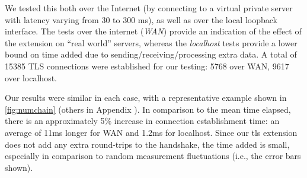 We tested this both over the Internet (by connecting to a virtual private server
with latency varying from 30 to 300 ms), as well as over the local loopback
interface. The tests over the internet (\emph{WAN}) provide an indication of the
effect of the extension on ``real world'' servers, whereas the \emph{localhost}
tests provide a lower bound on time added due to sending/receiving/processing
extra data. A total of 15385 TLS connections were established for our testing:
5768 over WAN, 9617 over localhost.

Our results were similar in each case, with a representative example shown in
\autoref{fig:numchain} (others in Appendix ). In comparison to the
mean time elapsed, there is an approximately 5\% increase in connection
establishment time: an average of 11ms longer for WAN and 1.2ms for localhost.
Since our \ac{tls} extension does not add any extra round-trips to the
handshake, the time added is small, especially in comparison to random
measurement fluctuations (i.e., the error bars shown).

